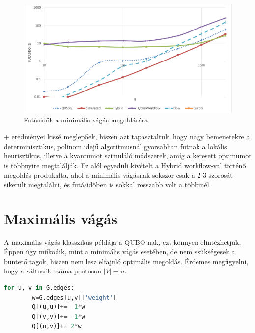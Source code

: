 \begin{figure}[!ht]
	\centering
	\includegraphics[width=150mm, keepaspectratio]{figures/diagrams/minCutRuntimes.png}
	\caption{Futásidők a minimális vágás megoldására}
	\label{fig:minCutRuntimes}
\end{figure}

\Az+ eredményei kissé meglepőek, hiszen azt tapasztaltuk, hogy nagy bemenetekre a determinisztikus, polinom idejű algoritmusnál gyorsabban futnak a lokális heurisztikus, illetve a kvantumot szimuláló módszerek, amíg a keresett optimumot is többnyire megtalálják. Ez alól egyedüli kivételt a Hybrid workflow-val történő megoldás produkálta, ahol a minimális vágásnak sokszor csak a 2-3-szorosát sikerült megtalálni, és futásidőben is sokkal rosszabb volt a többinél.

\section{Maximális vágás}\label{sec:practiceMaxCut}

A maximális vágás klasszikus példája a QUBO-nak, ezt könnyen elintézhetjük.
Éppen úgy működik, mint a minimális vágás esetében, de nem szükségesek a büntető tagok, hiszen nem lesz elfajuló optimális megoldás.
Érdemes megfigyelni, hogy a változók száma pontosan $|V|=n$.

\vspace{5pt}
\begin{lstlisting}[language=python,caption=Maximális vágás QUBO előállítása,label=code:maxCutQUBO]
	for u, v in G.edges:
		w=G.edges[u,v]['weight']
		Q[(u,u)]+= -1*w
		Q[(v,v)]+= -1*w
		Q[(u,v)]+= 2*w
\end{lstlisting}


